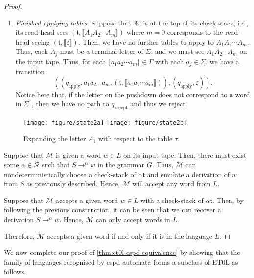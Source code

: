 \begin{proof}
\begin{enumerate}
		\item \textit{Finished applying tables.}
		Suppose that $\mathcal{M}$ is at the top of its check-stack, i.e., its read-head sees $(\mathfrak{t}, \llbracket A_1 A_2 \cdots A_m \rrbracket)$ where $m=0$ corresponds to the read-head seeing $(\mathfrak{t},\llbracket \varepsilon \rrbracket)$.
		Then, we have no further tables to apply to $A_1 A_2 \cdots A_m$.
		Thus, each $A_j$ must be a terminal letter of $\Sigma$, and we must see $A_1 A_2 \cdots A_m$ on the input tape.
		Thus, for each $\llbracket a_1 a_2 \cdots a_m \rrbracket \in \Gamma$ with each $a_j \in \Sigma$, we have a transition
		\[
		(
		(q_\mathrm{apply}, a_1 a_2 \cdots a_m, (\mathfrak{t}, \llbracket a_1 a_2 \cdots a_m \rrbracket)),
		(q_\mathrm{apply}, \varepsilon)
		).
		\]
		Notice here that, if the letter on the pushdown does not correspond to a word in $\Sigma^*$, then we have no path to $q_\mathrm{accept}$ and thus we reject.
		
	\end{enumerate}
	
	\begin{figure}[!ht]
		\centering
		\texttt{[image: figure/state2a]}
		\hspace*{.05\linewidth}
		\texttt{[image: figure/state2b]}
		\caption{Expanding the letter $A_1$ with respect to the table $\tau$.}%
		\label{fig:cspd expanding letter}
	\end{figure}
	
	
	Suppose that $\mathcal{M}$ is given a word $w \in L$ on its input tape.
	Then, there must exist some $\alpha \in \mathcal{R}$ such that $S \to^\alpha w$ in the grammar $G$.
	Thus, $\mathcal{M}$ can nondeterministically choose a check-stack of $\alpha\mathfrak{t}$ and emulate a derivation of $w$ from $S$ as previously described.
	Hence, $\mathcal{M}$ will accept any word from $L$.
	
	Suppose that $\mathcal{M}$ accepts a given word $w \in L$ with a check-stack of $\alpha\mathfrak{t}$.
	Then, by following the previous construction, it can be seen that we can recover a derivation $S \to^\alpha w$.
	Hence, $\mathcal{M}$ can only accept words in $L$.
	
	Therefore, $\mathcal{M}$ accepts a given word if and only if it is in the language $L$.
\end{proof}

We now complete our proof of \cref{thm:et0l-cspd-equivalence} by showing that the family of languages recognised by cspd automata forms a subclass of ET0L as follows.

